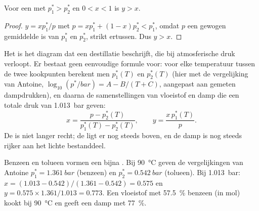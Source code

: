 \begin{proposition}\label{prop:b2:liquid-vapour-diagrams:richer}
Voor een  met $p_1^* > p_2^*$ en $0 < x < 1$ is $y > x$.
\end{proposition}

\begin{proof}
$y = xp_1^*/p$ met $p = xp_1^* + (1 - x)p_2^* < p_1^*$, omdat $p$ een
gewogen gemiddelde is van $p_1^*$ en $p_2^*$, strikt ertussen. Dus $y >
x$.
\end{proof}

Het  is het diagram dat een destillatie beschrijft, die bij
atmosferische druk verloopt. Er bestaat geen eenvoudige formule voor: voor elke temperatuur tussen
de twee kookpunten berekent men $p_1^*(T)$ en $p_2^*(T)$ (hier met de
vergelijking van Antoine, $\log_{10}(p^*/\unit{bar}) = A - B/(T + C)$, aangepast aan
gemeten dampdrukken), en daarna de samenstellingen van vloeistof en damp die
een totale druk van \qty{1.013}{bar} geven:
\[
  x = \frac{p - p_2^*(T)}{p_1^*(T) - p_2^*(T)}, \qquad y = \frac{x\,p_1^*(T)}{p} .
\]
De  is niet langer recht; de  ligt er nog steeds boven, en
de damp is nog steeds rijker aan het lichte bestanddeel.

\begin{example}\label{ex:b2:liquid-vapour-diagrams:benzene-toluene}
Benzeen en tolueen vormen een bijna . Bij \qty{90}{\degreeCelsius}
geven de vergelijkingen van Antoine $p_1^* = \qty{1.361}{bar}$ (benzeen) en $p_2^* =
\qty{0.542}{bar}$ (tolueen). Bij \qty{1.013}{bar}: $x = (1.013 - 0.542)/(1.361 -
0.542) = 0.575$ en $y = 0.575 \times 1.361/1.013 = 0.773$. Een vloeistof met 57.5~\%
benzeen (in mol) kookt bij \qty{90}{\degreeCelsius} en geeft een damp met
77~\%.
\end{example}

